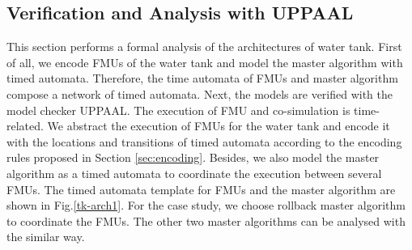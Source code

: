 \subsection{Verification and Analysis with UPPAAL}
\label{sec:mauppaal}
This section performs a formal analysis of the architectures of water tank. First of all, we encode FMUs of the water tank and model the master algorithm with timed automata. Therefore, the time automata of FMUs and master algorithm compose a network of timed automata. Next, the models are verified with the model checker UPPAAL. 
The execution of FMU and co-simulation is time-related. We abstract the execution of FMUs for the water tank and encode it with the locations and transitions of timed automata according to the encoding rules proposed in Section \ref{sec:encoding}. Besides, we also model the master algorithm as a timed automata to coordinate the execution between several FMUs. The timed automata template for FMUs and the master algorithm are shown in Fig.\ref{tk-arch1}. For the case study, we choose rollback master algorithm to coordinate the FMUs. The other two master algorithms can be analysed with the similar way. 

